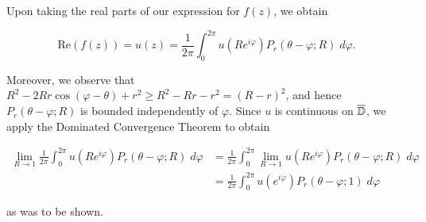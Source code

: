\begin{solution}
    Upon taking the real parts of our expression for $f(z)$, we obtain

    $$
    \text{Re}(f(z)) = u(z) = \frac{1}{2 \pi} \int_0^{2 \pi} u(R e^{i \varphi}) P_r(\theta - \varphi; R) \; d\varphi.
    $$

    Moreover, we observe that $R^2  - 2 R r \cos{(\varphi - \theta)} + r^2 \ge R^2 - R r - r^2 = (R - r)^2$, and hence
    $P_r(\theta - \varphi; R)$ is bounded independently of $\varphi$. Since $u$ is continuous on $\overline{\mathbb{D}}$, we apply the
    Dominated Convergence Theorem to obtain

    \begin{align*}
      \lim_{R \to 1} \frac{1}{2 \pi} \int_0^{2 \pi} u(R e^{i \varphi}) P_r(\theta - \varphi; R) \; d\varphi 
      &= \frac{1}{2 \pi} \int_0^{2 \pi} \lim_{R \to 1} u(R e^{i \varphi}) P_r(\theta - \varphi; R) \; d\varphi \\
      & = \frac{1}{2 \pi} \int_0^{2 \pi} u(e^{i \varphi}) P_r(\theta - \varphi; 1) \; d\varphi
    \end{align*}

    as was to be shown.
\end{solution}
